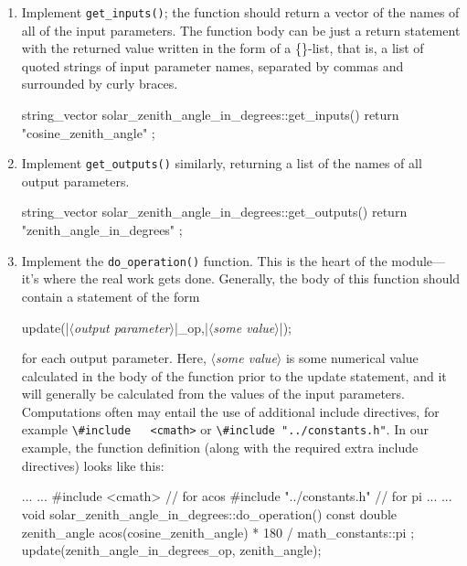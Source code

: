 \documentclass{article}\usepackage[]{graphicx}\usepackage[]{color}
\newcommand{\code}[1]{\lstinline[style=C++style]{#1}}
\newcommand{\placeholder}[1]{$\langle$\textrm{\textit{#1}}$\rangle$}
\begin{document}
\begin{enumerate}
\item Implement \code{get_inputs()}; the function should return a
  vector of the names of all of the input parameters.  The function
  body can be just a return statement with the returned value written
  in the form of a \{\}-list, that is, a list of quoted strings of
  input parameter names, separated by commas and surrounded by curly
  braces.

  \begin{example}[4]
    string_vector solar_zenith_angle_in_degrees::get_inputs() {
        return {
            "cosine_zenith_angle"
        };
    }
  \end{example}

\item Implement \code{get_outputs()} similarly, returning a list of
  the names of all output parameters.
  \begin{example}[4]
    string_vector solar_zenith_angle_in_degrees::get_outputs() {
        return {
            "zenith_angle_in_degrees"
        };
    }
  \end{example}

\item Implement the \code{do_operation()} function.  This is the heart
  of the module---it's where the real work gets done.  Generally, the
  body of this function should contain a statement of the form
  \begin{C++listing}[4]
    update(|\placeholder{output parameter}|_op,|\placeholder{some value}|);
  \end{C++listing}
  for each output parameter.  Here, \placeholder{some value} is some
  numerical value calculated in the body of the function prior to the
  update statement, and it will generally be calculated from the
  values of the input parameters.  Computations often may entail the
  use of additional include directives, for example \code{\#include
  <cmath>} or \code{\#include "../constants.h"}.  In our example, the
  function definition (along with the required extra include
  directives) looks like this:
  \begin{example}[4]
    ...
    ...
    #include <cmath> // for acos
    #include "../constants.h" // for pi
    ...
    ...
    void solar_zenith_angle_in_degrees::do_operation() const {
        double zenith_angle { acos(cosine_zenith_angle)
                                * 180 / math_constants::pi };
        update(zenith_angle_in_degrees_op, zenith_angle);
    }
  \end{example}

\end{enumerate}
\end{document}
